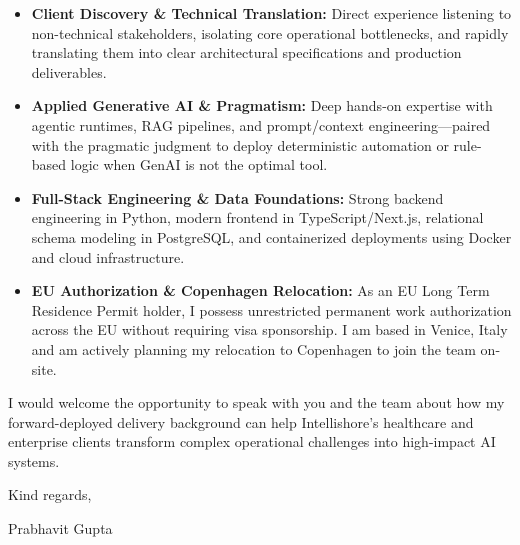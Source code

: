 \documentclass[11pt,a4paper]{article}
\begin{document}
\begin{itemize}[leftmargin=*]
    \item \textbf{Client Discovery \& Technical Translation:} Direct experience listening to non-technical stakeholders, isolating core operational bottlenecks, and rapidly translating them into clear architectural specifications and production deliverables.
    \item \textbf{Applied Generative AI \& Pragmatism:} Deep hands-on expertise with agentic runtimes, RAG pipelines, and prompt/context engineering—paired with the pragmatic judgment to deploy deterministic automation or rule-based logic when GenAI is not the optimal tool.
    \item \textbf{Full-Stack Engineering \& Data Foundations:} Strong backend engineering in Python, modern frontend in TypeScript/Next.js, relational schema modeling in PostgreSQL, and containerized deployments using Docker and cloud infrastructure.
    \item \textbf{EU Authorization \& Copenhagen Relocation:} As an EU Long Term Residence Permit holder, I possess unrestricted permanent work authorization across the EU without requiring visa sponsorship. I am based in Venice, Italy and am actively planning my relocation to Copenhagen to join the team on-site.
\end{itemize}

\noindent I would welcome the opportunity to speak with you and the team about how my forward-deployed delivery background can help Intellishore's healthcare and enterprise clients transform complex operational challenges into high-impact AI systems.

\vspace{8pt}

\noindent Kind regards,

\vspace{8pt}

\noindent Prabhavit Gupta
\end{document}
